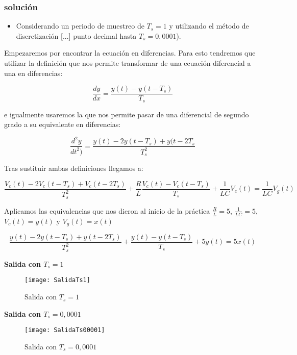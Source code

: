\subsubsection{solución}
\begin{itemize}
\item Considerando un periodo de muestreo de $ T_s = 1 $ y utilizando el método de discretización [...] punto decimal hasta $T_s = 0,0001$).
\end{itemize}

Empezaremos por encontrar la ecuación en diferencias. Para esto tendremos que utilizar la definición que nos permite transformar de una ecuación diferencial a una en diferencias:

\begin{equation}
\frac{dy}{dx}=\frac{y(t)-y(t-T_s)}{T_s}
\end{equation}

\noindent e igualmente usaremos la que nos permite pasar de una diferencial de segundo grado a su equivalente en diferencias:

\begin{equation}
\frac{d^2y}{dt^2)}=\frac{y(t)-2y(t-T_s)+y(t-2T_s}{T_s^2}
\end{equation}

\noindent Tras sustituir ambas definiciones llegamos a:

\begin{equation}
\frac{V_c(t)-2V_c(t-T_s)+V_c(t-2T_s)}{T_s^2}+\frac{R}{L}\frac{V_c(t)-V_c(t-T_s)}{T_s}+\frac{1}{LC}V_c(t)=\frac{1}{LC}V_g(t)
\end{equation}

\noindent Aplicamos las equivalencias que nos dieron al inicio de la práctica $\frac{R}{L}=5$, $\frac{1}{LC}=5$, $V_c(t)=y(t)$ y $V_g(t)=x(t)$

\begin{equation}
\frac{y(t)-2y(t-T_s)+y(t-2T_s)}{T_s^2}+\frac{y(t)-y(t-T_s)}{T_s}+5y(t)=5x(t)
\end{equation}

\noindent \textbf{Salida con $T_s=1$}

\begin{figure}[H]
\centering
\texttt{[image: SalidaTs1]}
\caption{Salida con $T_s=1$}
\label{fig:salidaTs1}
\end{figure}

\noindent \textbf{Salida con $T_s=0,0001$}

\begin{figure}[H]
\centering
\texttt{[image: SalidaTs00001]}
\caption{Salida con $T_s=0,0001$}
\label{fig:salidaTs01}
\end{figure}


